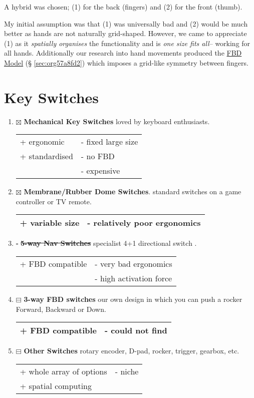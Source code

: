 \documentclass[logo,bsc,singlespacing,parskip]{infthesis}
\begin{document}
A hybrid was chosen; (1) for the back (fingers) and (2) for the front (thumb).

My initial assumption was that (1) was universally bad and (2) would be much better as hands are not naturally grid-shaped.
However, we came to appreciate (1) as it \emph{spatially organises} the functionality and is \emph{one size fits all}-- working for all hands.
Additionally our research into hand movements produced the \hyperref[sec:org57a8fd2]{FBD Model} (§ \ref{sec:org57a8fd2}) which imposes a grid-like symmetry between fingers.
\section{Key Switches}
\label{sec:orgba1a122}
\begin{enumerate}
\item{$\boxtimes$} \textbf{Mechanical Key Switches} loved by keyboard enthusiasts.
\begin{longtable}{|p{6.25cm}|p{6.25cm}|}
\hline
+ ergonomic & - fixed large size\\
+ standardised & - no FBD\\
 & - expensive\\
\hline
\end{longtable}
\item{$\boxtimes$} \textbf{Membrane/Rubber Dome Switches}. standard switches on a game controller or TV remote.
\begin{longtable}{|p{6.25cm}|p{6.25cm}|}
\hline
+ variable size & - relatively poor ergonomics\\
\hline
\end{longtable}
\item{$\square$} \sout{\textbf{5-way Nav Switches}} specialist 4+1 directional switch \autocite{Thruhole5wayNavigation}.
\begin{longtable}{|p{6.25cm}|p{6.25cm}|}
\hline
+ FBD compatible & - very bad ergonomics\\
 & - high activation force\\
\hline
\end{longtable}
\item{$\boxminus$} \textbf{3-way FBD switches} our own design in which you can push a rocker Forward, Backward or Down.
\begin{longtable}{|p{6.25cm}|p{6.25cm}|}
\hline
+ FBD compatible & - could not find\\
\hline
\end{longtable}
\item{$\boxminus$} \textbf{Other Switches} rotary encoder, D-pad, rocker, trigger, gearbox, etc.
\begin{longtable}{|p{6.25cm}|p{6.25cm}|}
\hline
+ whole array of options & - niche\\
+ spatial computing & \\
\hline
\end{longtable}
\end{enumerate}
\end{document}
